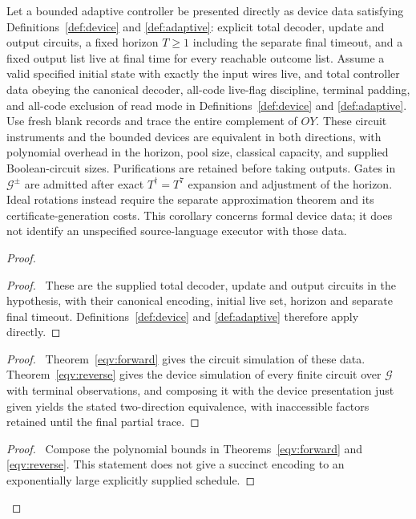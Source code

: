 \begin{corollary}\label{eqv:adaptive-circuits}
Let a bounded adaptive controller be presented directly as device data satisfying Definitions~\ref{def:device} and \ref{def:adaptive}: explicit total decoder, update and output circuits, a fixed horizon $T\ge1$ including the separate final timeout, and a fixed output list live at final time for every reachable outcome list. Assume
a valid specified initial state with exactly the input wires live,
and total controller data obeying the canonical decoder, all-code
live-flag discipline, terminal padding, and all-code exclusion of read
mode in Definitions~\ref{def:device} and \ref{def:adaptive}.
Use fresh blank records and trace the entire complement of $OY$.
These circuit instruments and the
bounded devices are equivalent in both directions, with polynomial
overhead in the horizon, pool size, classical capacity, and supplied
Boolean-circuit sizes. Purifications are retained before taking outputs.
Gates in $\mathcal G^{\pm}$ are admitted after exact $T^\dagger=T^7$
expansion and adjustment of the horizon. Ideal rotations instead require
the separate approximation theorem and its certificate-generation costs.
This corollary concerns formal device data; it does not identify an
unspecified source-language executor with those data.
\end{corollary}
\begin{proof}
 \begin{proof}\pf\ These are the supplied total decoder, update and output circuits in the hypothesis, with their canonical encoding, initial live set, horizon and separate final timeout. Definitions~\ref{def:device} and \ref{def:adaptive} therefore apply directly.\end{proof}
 \begin{proof}\pf\ Theorem~\ref{eqv:forward} gives the circuit simulation of these data. Theorem~\ref{eqv:reverse} gives the device simulation of every finite circuit over $\mathcal G$ with terminal observations, and composing it with the device presentation just given yields the stated two-direction equivalence, with inaccessible factors retained until the final partial trace.\end{proof}
 \qedstep
 \begin{proof}\pf\ Compose the polynomial bounds in
 Theorems~\ref{eqv:forward} and \ref{eqv:reverse}. This statement does
 not give a succinct encoding to an exponentially large explicitly
 supplied schedule. 
 \end{proof}
\end{proof}

